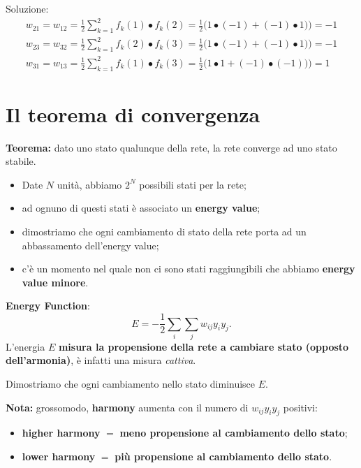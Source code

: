 Soluzione:
\begin{equation}
    \begin{split}
        w_{21}=w_{12}=\frac{1}{2}\sum^2_{k=1}f_k(1)\bullet f_k(2) = \frac{1}{2}\Big( 1\bullet(-1)+(-1)\bullet 1) \Big) = -1 \\
        w_{23}=w_{32}=\frac{1}{2}\sum^2_{k=1}f_k(2)\bullet f_k(3) = \frac{1}{2}\Big( 1\bullet(-1)+(-1)\bullet 1) \Big) = -1 \\
        w_{31}=w_{13}=\frac{1}{2}\sum^2_{k=1}f_k(1)\bullet f_k(3) = \frac{1}{2}\Big( 1\bullet1+(-1)\bullet (-1)) \Big) = 1
    \end{split}
\end{equation}
\newpage

\section{Il teorema di convergenza}
\textbf{Teorema:} dato uno stato qualunque della rete, la rete converge ad uno stato stabile.
\begin{itemize}
    \item Date $N$ unità, abbiamo $2^N$ possibili stati per la rete;
    \item ad ognuno di questi stati è associato un \textbf{energy value};
    \item dimostriamo che ogni cambiamento di stato della rete porta ad un abbassamento dell'energy value;
    \item c'è un momento nel quale non ci sono stati raggiungibili che abbiamo \textbf{energy value minore}.
\end{itemize}


\textbf{Energy Function}:
\begin{equation}
    E=-\frac{1}{2}\sum_i\sum_jw_{ij}y_iy_j.
\end{equation}
L'energia $E$ \textbf{misura la propensione della rete a cambiare stato (opposto dell'armonia)}, è infatti una misura \textit{cattiva}.


Dimostriamo che ogni cambiamento nello stato diminuisce $E$.



\textbf{Nota:} grossomodo, \textbf{harmony} aumenta con il numero di $w_{ij}y_iy_j$ positivi: 
\begin{itemize}
    \item \textbf{higher harmony} $=$ \textbf{meno propensione al cambiamento dello stato};
    \item  \textbf{lower harmony} $=$ \textbf{più propensione al cambiamento dello stato}.
\end{itemize}


